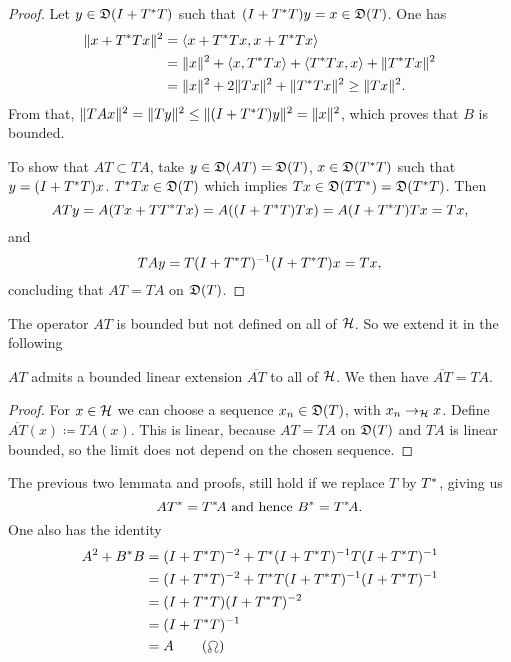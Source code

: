 \documentclass[a4paper,10pt]{article}
\begin{document}
\begin{proof}
 Let $y \in \mathfrak{D}(I + T ^{*} T)$ such that $(I + T ^{*} T)y = x \in \mathfrak{D}(T)$. One has 
 \begin{align*}
   \|x + T ^{*} T x\|^2 &= \left\langle x + T ^{*} T x, x + T ^{*} T x \right\rangle\\
   &= \|x\|^2 +  \left\langle x, T ^{*} Tx \right\rangle + \left\langle T ^{*} Tx, x \right\rangle+ \|T ^{*} Tx\|^2\\
   &= \|x\|^2 + 2\|Tx\|^2 + \|T ^{*} Tx\|^2 \geq \|Tx\|^2.
 \end{align*}
From that, $\| TAx\|^2 = \| Ty \| ^2 \leq \| (I + T ^{*} T)y \|^2 = \| x \| ^2$, which proves that $B$ is bounded. 

To show that $AT \subset TA$, take $y \in \mathfrak{D}(AT) = \mathfrak{D}(T)$, $x \in \mathfrak{D}(T ^{*} T)$ such that $y = ( I +  T ^{*} T)x$. $T ^{*} T x \in \mathfrak{D}(T)$ which implies $Tx \in \mathfrak{D}(TT^{*}) = \mathfrak{D}(T^{*} T)$. Then 
\[
 ATy = A(Tx + T T^{*} T x) = A((I + T^{*} T)Tx)= A(I+ T^{*} T)Tx= Tx,
\]
and
\[
 TAy= T(I+ T^{*} T)^{-1} (I + T ^{*} T)x=Tx,
\]
concluding that $AT = TA$ on $\mathfrak{D}(T)$.

\end{proof}

The operator $AT$ is bounded but not defined on all of $\mathcal{H}$. So we extend it in the following

\begin{lem}
 $AT$ admits a bounded linear extension $\overline{AT}$ to all of $\mathcal{H}$. We then have $\overline{AT}=TA$.
\end{lem}

\begin{proof}
 For $x \in \mathcal{H}$ we can choose a sequence $x_n \in \mathfrak{D}(T)$, with $x_n \rightarrow_{\mathcal{H}} x$. Define $\overline{AT}(x) \coloneqq TA(x)$. This is linear, because $AT = TA$ on $\mathfrak{D}(T)$ and $TA$ is linear bounded, so the limit does not depend on the chosen sequence.
\end{proof}

\begin{rem}
 The previous two lemmata and proofs, still hold if we replace $T$ by $T^{*}$, giving us 
 \[
  AT^{*} = T^{*} \! A \text{ and hence } B^{*} = T^{*} \! A.
 \]
 One also has the identity
 \begin{align*}
  A^2 + B^{*} B &= (I + T^{*} T)^{-2} + T ^{*} (I + T^{*} T)^{-1} T (I + T^{*} T) ^{-1} \\
		&= (I + T^{*} T)^{-2} + T ^{*} T(I + T^{*} T)^{-1} (I + T^{*} T) ^{-1} \\
		&= (I + T^{*} T)(I + T^{*} T)^{-2} \\
		&= (I + T^{*} T)^{-1}  \\
		&= A \tag{\leo}
  \end{align*}

  

\end{rem}
\end{document}
